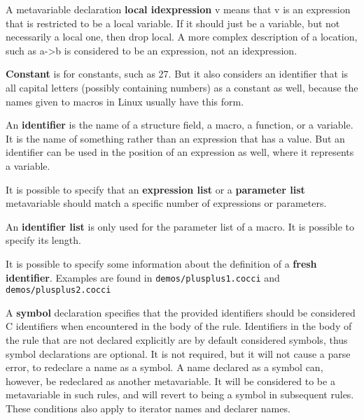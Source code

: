 \begin{grammar}



\end{grammar}

A metavariable declaration {\bf local idexpression} v means that v is an
expression that is restricted to be a local variable.  If it should just be
a variable, but not necessarily a local one, then drop local.  A more
complex description of a location, such as a->b is considered to be an
expression, not an idexpression.

{\bf Constant} is for constants, such as 27.  But it also considers an
identifier that is all capital letters (possibly containing numbers) as a
constant as well, because the names given to macros in Linux usually have
this form.

An {\bf identifier} is the name of a structure field, a macro, a function,
or a variable.  It is the name of something rather than an expression that
has a value.  But an identifier can be used in the position of an
expression as well, where it represents a variable.

It is possible to specify that an {\bf expression list} or a {\bf parameter
  list} metavariable should match a specific number of expressions or
parameters.

An {\bf identifier list} is only used for the parameter list of a macro.
It is possible to specify its length.

It is possible to specify some information about the definition of a {\bf
  fresh identifier}.  Examples are found in {\tt demos/plusplus1.cocci} and
{\tt demos/plusplus2.cocci} %

A {\bf symbol} declaration specifies that the provided identifiers should
be considered C identifiers when encountered in the body of the rule.
Identifiers in the body of the rule that are not declared explicitly are by
default considered symbols, thus symbol declarations are optional.  It is
not required, but it will not cause a parse error, to redeclare a name as a
symbol.  A name declared as a symbol can, however, be redeclared as another
metavariable.  It will be considered to be a metavariable in such rules,
and will revert to being a symbol in subsequent rules.  These conditions
also apply to iterator names and declarer names.

